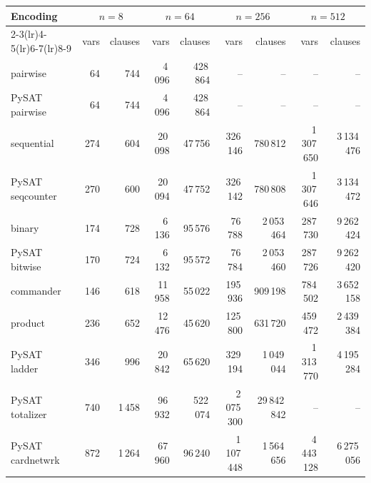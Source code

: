 \begin{tabular}{@{}lrrrrrrrr@{}}
\toprule
Encoding & \multicolumn{2}{c}{$n=8$} & \multicolumn{2}{c}{$n=64$} & \multicolumn{2}{c}{$n=256$} & \multicolumn{2}{c}{$n=512$} \\
\cmidrule(lr){2-3}\cmidrule(lr){4-5}\cmidrule(lr){6-7}\cmidrule(lr){8-9}
 & vars & clauses & vars & clauses & vars & clauses & vars & clauses \\
\midrule
pairwise & 64 & 744 & 4\,096 & 428\,864 & -- & -- & -- & -- \\
PySAT pairwise & 64 & 744 & 4\,096 & 428\,864 & -- & -- & -- & -- \\
sequential & 274 & 604 & 20\,098 & 47\,756 & 326\,146 & 780\,812 & 1\,307\,650 & 3\,134\,476 \\
PySAT seqcounter & 270 & 600 & 20\,094 & 47\,752 & 326\,142 & 780\,808 & 1\,307\,646 & 3\,134\,472 \\
binary & 174 & 728 & 6\,136 & 95\,576 & 76\,788 & 2\,053\,464 & 287\,730 & 9\,262\,424 \\
PySAT bitwise & 170 & 724 & 6\,132 & 95\,572 & 76\,784 & 2\,053\,460 & 287\,726 & 9\,262\,420 \\
commander & 146 & 618 & 11\,958 & 55\,022 & 195\,936 & 909\,198 & 784\,502 & 3\,652\,158 \\
product & 236 & 652 & 12\,476 & 45\,620 & 125\,800 & 631\,720 & 459\,472 & 2\,439\,384 \\
\midrule
PySAT ladder & 346 & 996 & 20\,842 & 65\,620 & 329\,194 & 1\,049\,044 & 1\,313\,770 & 4\,195\,284 \\
PySAT totalizer & 740 & 1\,458 & 96\,932 & 522\,074 & 2\,075\,300 & 29\,842\,842 & -- & -- \\
PySAT cardnetwrk & 872 & 1\,264 & 67\,960 & 96\,240 & 1\,107\,448 & 1\,564\,656 & 4\,443\,128 & 6\,275\,056 \\
\bottomrule
\end{tabular}
